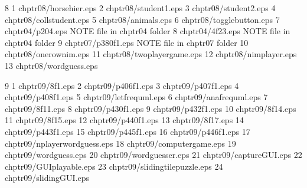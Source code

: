 8	1	chptr08/horsehier.eps
	2	chptr08/student1.eps
	3	chptr08/student2.eps
	4	chptr08/collstudent.eps
	5	chptr08/animals.eps
	6	chptr08/togglebutton.eps
	7	chptr04/p204.eps         NOTE file in chptr04 folder
	8	chptr04/4f23.eps         NOTE file in chptr04 folder
	9	chptr07/p380f1.eps       NOTE file in chptr07 folder
	10	chptr08/onerownim.eps
	11	chptr08/twoplayergame.eps
	12	chptr08/nimplayer.eps
	13	chptr08/wordguess.eps

9	1	chptr09/8f1.eps
	2	chptr09/p406f1.eps
	3	chptr09/p407f1.eps
	4	chptr09/p408f1.eps
	5	chptr09/letfrequml.eps
	6	chptr09/anafrequml.eps
	7	chptr09/8f11.eps
	8	chptr09/p430f1.eps
	9	chptr09/p432f1.eps
	10	chptr09/8f14.eps
	11	chptr09/8f15.eps
	12	chptr09/p440f1.eps
	13	chptr09/8f17.eps
	14	chptr09/p443f1.eps
	15	chptr09/p445f1.eps
	16	chptr09/p446f1.eps
	17	chptr09/nplayerwordguess.eps
	18	chptr09/computergame.eps
	19	chptr09/wordguess.eps
	20	chptr09/wordguesser.eps
	21	chptr09/captureGUI.eps
	22	chptr09/GUIplayable.eps
	23	chptr09/slidingtilepuzzle.eps
	24	chptr09/slidingGUI.eps
